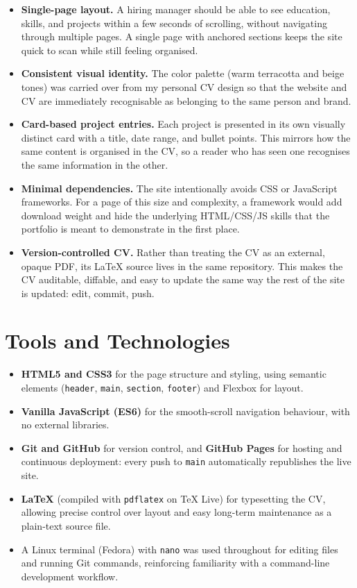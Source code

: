 \documentclass[11pt,a4paper]{article}
\begin{document}
\begin{itemize}
  \item \textbf{Single-page layout.} A hiring manager should be able to see education, skills,
        and projects within a few seconds of scrolling, without navigating through multiple
        pages. A single page with anchored sections keeps the site quick to scan while still
        feeling organised.
  \item \textbf{Consistent visual identity.} The color palette (warm terracotta and beige tones)
        was carried over from my personal CV design so that the website and CV are immediately
        recognisable as belonging to the same person and brand.
  \item \textbf{Card-based project entries.} Each project is presented in its own visually
        distinct card with a title, date range, and bullet points. This mirrors how the same
        content is organised in the CV, so a reader who has seen one recognises the same
        information in the other.
  \item \textbf{Minimal dependencies.} The site intentionally avoids CSS or JavaScript
        frameworks. For a page of this size and complexity, a framework would add
        download weight and hide the underlying HTML/CSS/JS skills that the portfolio is meant to
        demonstrate in the first place.
  \item \textbf{Version-controlled CV.} Rather than treating the CV as an external, opaque PDF,
        its LaTeX source lives in the same repository. This makes the CV auditable, diffable, and
        easy to update the same way the rest of the site is updated: edit, commit, push.
\end{itemize}

\section{Tools and Technologies}
\begin{itemize}
  \item \textbf{HTML5 and CSS3} for the page structure and styling, using semantic elements
        (\texttt{header}, \texttt{main}, \texttt{section}, \texttt{footer}) and Flexbox for
        layout.
  \item \textbf{Vanilla JavaScript (ES6)} for the smooth-scroll navigation behaviour, with no
        external libraries.
  \item \textbf{Git and GitHub} for version control, and \textbf{GitHub Pages} for hosting and
        continuous deployment: every push to \texttt{main} automatically republishes the live
        site.
  \item \textbf{LaTeX} (compiled with \texttt{pdflatex} on TeX Live) for typesetting the CV,
        allowing precise control over layout and easy long-term maintenance as a plain-text
        source file.
  \item A Linux terminal (Fedora) with \texttt{nano} was used throughout for editing files and
        running Git commands, reinforcing familiarity with a command-line development workflow.
\end{itemize}
\end{document}
